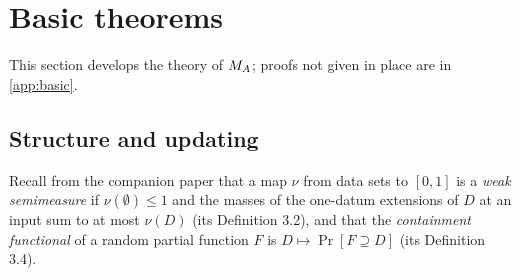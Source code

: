 \section{Basic theorems}\label{sec:basic}

This section develops the theory of $M_{A}$; proofs not given in place are in \cref{app:basic}.

\subsection{Structure and updating}\label{sec:basic:structure}

Recall from the companion paper \citep{claudeSFI2026fundamentals} that a map $\nu$ from data sets to $[0,1]$ is a \emph{weak semimeasure} if $\nu(\emptyset)\le1$ and the masses of the one-datum extensions of $D$ at an input sum to at most $\nu(D)$ (its Definition 3.2), and that the \emph{containment functional} of a random partial function $F$ is $D\mapsto\Pr[F\supseteq D]$ (its Definition 3.4).

